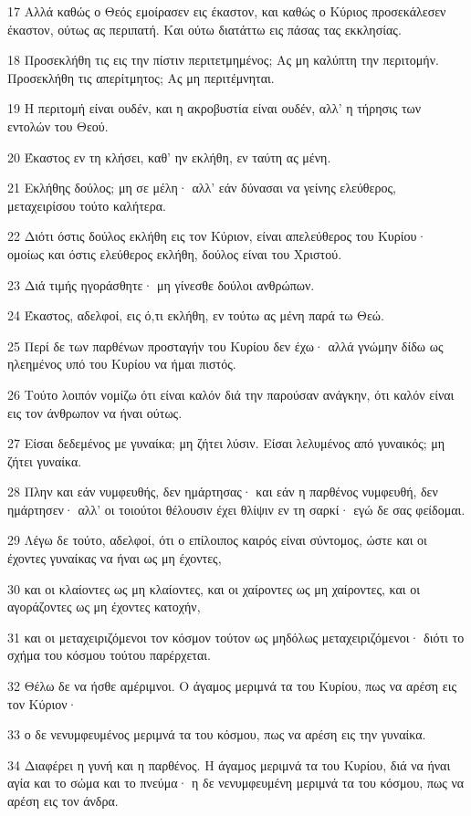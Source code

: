 \par 17 Αλλά καθώς ο Θεός εμοίρασεν εις έκαστον, και καθώς ο Κύριος προσεκάλεσεν έκαστον, ούτως ας περιπατή. Και ούτω διατάττω εις πάσας τας εκκλησίας.
\par 18 Προσεκλήθη τις εις την πίστιν περιτετμημένος; Ας μη καλύπτη την περιτομήν. Προσεκλήθη τις απερίτμητος; Ας μη περιτέμνηται.
\par 19 Η περιτομή είναι ουδέν, και η ακροβυστία είναι ουδέν, αλλ' η τήρησις των εντολών του Θεού.
\par 20 Έκαστος εν τη κλήσει, καθ' ην εκλήθη, εν ταύτη ας μένη.
\par 21 Εκλήθης δούλος; μη σε μέλη· αλλ' εάν δύνασαι να γείνης ελεύθερος, μεταχειρίσου τούτο καλήτερα.
\par 22 Διότι όστις δούλος εκλήθη εις τον Κύριον, είναι απελεύθερος του Κυρίου· ομοίως και όστις ελεύθερος εκλήθη, δούλος είναι του Χριστού.
\par 23 Διά τιμής ηγοράσθητε· μη γίνεσθε δούλοι ανθρώπων.
\par 24 Έκαστος, αδελφοί, εις ό,τι εκλήθη, εν τούτω ας μένη παρά τω Θεώ.
\par 25 Περί δε των παρθένων προσταγήν του Κυρίου δεν έχω· αλλά γνώμην δίδω ως ηλεημένος υπό του Κυρίου να ήμαι πιστός.
\par 26 Τούτο λοιπόν νομίζω ότι είναι καλόν διά την παρούσαν ανάγκην, ότι καλόν είναι εις τον άνθρωπον να ήναι ούτως.
\par 27 Είσαι δεδεμένος με γυναίκα; μη ζήτει λύσιν. Είσαι λελυμένος από γυναικός; μη ζήτει γυναίκα.
\par 28 Πλην και εάν νυμφευθής, δεν ημάρτησας· και εάν η παρθένος νυμφευθή, δεν ημάρτησεν· αλλ' οι τοιούτοι θέλουσιν έχει θλίψιν εν τη σαρκί· εγώ δε σας φείδομαι.
\par 29 Λέγω δε τούτο, αδελφοί, ότι ο επίλοιπος καιρός είναι σύντομος, ώστε και οι έχοντες γυναίκας να ήναι ως μη έχοντες,
\par 30 και οι κλαίοντες ως μη κλαίοντες, και οι χαίροντες ως μη χαίροντες, και οι αγοράζοντες ως μη έχοντες κατοχήν,
\par 31 και οι μεταχειριζόμενοι τον κόσμον τούτον ως μηδόλως μεταχειριζόμενοι· διότι το σχήμα του κόσμου τούτου παρέρχεται.
\par 32 Θέλω δε να ήσθε αμέριμνοι. Ο άγαμος μεριμνά τα του Κυρίου, πως να αρέση εις τον Κύριον·
\par 33 ο δε νενυμφευμένος μεριμνά τα του κόσμου, πως να αρέση εις την γυναίκα.
\par 34 Διαφέρει η γυνή και η παρθένος. Η άγαμος μεριμνά τα του Κυρίου, διά να ήναι αγία και το σώμα και το πνεύμα· η δε νενυμφευμένη μεριμνά τα του κόσμου, πως να αρέση εις τον άνδρα.
